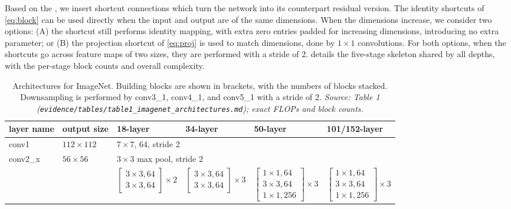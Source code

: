 Based on the \plainnet{}, we insert shortcut connections which turn the network
into its counterpart residual version. The identity shortcuts of
\cref{eq:block} can be used directly when the input and output are of the same
dimensions. When the dimensions increase, we consider two options: (A) the
shortcut still performs identity mapping, with extra zero entries padded for
increasing dimensions, introducing no extra parameter; or (B) the projection
shortcut of \cref{eq:proj} is used to match dimensions, done by $1\times1$
convolutions. For both options, when the shortcuts go across feature maps of two
sizes, they are performed with a stride of $2$.  details the
five-stage skeleton shared by all depths, with the per-stage block counts and
overall complexity.

\begin{table}[t]
\centering
\caption{Architectures for ImageNet. Building blocks are shown in brackets, with
the numbers of blocks stacked. Downsampling is performed by conv3\_1, conv4\_1,
and conv5\_1 with a stride of 2. \emph{Source: Table 1
(\texttt{evidence/tables/table1\_imagenet\_architectures.md}); exact FLOPs and
block counts.}}
\label{tab:arch}
\small
\setlength{\tabcolsep}{4pt}
\begin{tabular}{l l l l l l}
\toprule
layer name & output size & 18-layer & 34-layer & 50-layer & 101/152-layer \\
\midrule
conv1   & $112\times112$ & \multicolumn{4}{l}{$7\times7$, 64, stride 2} \\
\midrule
\multirow{2}{*}{conv2\_x} & \multirow{2}{*}{$56\times56$}
  & \multicolumn{4}{l}{$3\times3$ max pool, stride 2} \\
\cmidrule(l){3-6}
  & & $\left[\begin{smallmatrix}3\times3,64\\3\times3,64\end{smallmatrix}\right]\!\times2$
    & $\left[\begin{smallmatrix}3\times3,64\\3\times3,64\end{smallmatrix}\right]\!\times3$
    & $\left[\begin{smallmatrix}1\times1,64\\3\times3,64\\1\times1,256\end{smallmatrix}\right]\!\times3$
    & $\left[\begin{smallmatrix}1\times1,64\\3\times3,64\\1\times1,256\end{smallmatrix}\right]\!\times3$ \\

\end{tabular}
\end{table}
